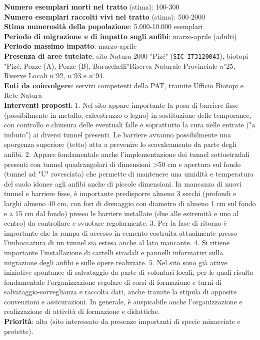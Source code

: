 \documentclass[11pt,a4paper,twoside]{memoir}
\begin{document}
\textbf{Numero esemplari morti nel tratto} (stima): 100-300 \\
\textbf{Numero esemplari raccolti vivi nel tratto} (stima): 500-2000 \\
\textbf{Stima numerosità della popolazione}: 5.000-10.000 esemplari \\
\textbf{Periodo di migrazione e di impatto sugli anfibi}: marzo-aprile (adulti) \\
\textbf{Periodo massimo impatto}: marzo-aprile \\
\textbf{Presenza di aree tutelate}: sito Natura 2000 "Pizé" (\texttt{SIC IT3120043}), biotopi "Pizé, Pozze (A), Pozze (B), Barucchelli"Riserva Naturale Provinciale $n^{\circ}$25, Riserve Locali $n^{\circ}$92, $n^{\circ}$93 e $n^{\circ}$94. \\
\textbf{Enti da coinvolgere}: servizi competenti della PAT, tramite Ufficio Biotopi e Rete Natura \\
\textbf{Interventi proposti}: 1. Nel sito appare importante la posa di barriere fisse (possibilmente in metallo, calcestruzzo o legno) in sostituzione delle temporanee, con controllo e chiusura delle eventuali falle e soprattutto la cura nelle entrate ("a imbuto") ai diversi tunnel presenti. Le barriere avranno possibilmente una sporgenza superiore (tetto) atta a prevenire lo scavalcamento da parte degli anfibi. 2. Appare fondamentale anche l'implementazione dei tunnel sottostradali presenti con tunnel quadrangolari di dimensioni >50 cm e apertura sul fondo (tunnel ad "U" rovesciata) che permette di mantenere una umidità e temperatura del suolo idonee agli anfibi anche di piccole dimensioni. In mancanza di nuovi tunnel e barriere fisse, è importante predisporre almeno 3 secchi (profondi e larghi almeno 40 cm, con fori di drenaggio con diametro di almeno 1 cm sul fondo e a 15 cm dal fondo) presso le barriere installate (due alle estremità e uno al centro) da controllare e svuotare regolarmente. 3. Per la fase di ritorno è importante che la rampa di accesso in cemento costruita attualmente presso l'imboccatura di un tunnel sia estesa anche al lato mancante. 4. Si ritiene importante l’installazione di cartelli stradali e pannelli informativi sulla migrazione degli anfibi e sulle opere realizzate. 5. Nel sito sono già attive iniziative spontanee di salvataggio da parte di volontari locali, per le quali risulta fondamentale l'organizzazione regolare di corsi di formazione e turni di salvataggio-sorveglianza e raccolta dati, anche tramite la stipula di apposite convenzioni e assicurazioni. In generale, è auspicabile anche l'organizzazione e realizzazione di attività di formazione e didattiche. \\
\textbf{Priorità}: alta (sito interessato da presenze importanti di specie minacciate e protette). \\
\end{document}
